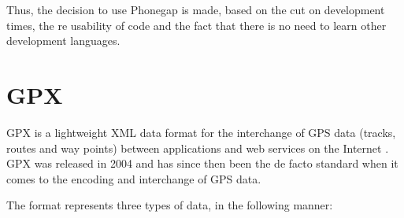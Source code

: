 Thus, the decision to use Phonegap is made, based on the cut on development times, the re usability of code and the fact that there is no need to learn other development languages.

\section{GPX}\label{sec:gpx}

GPX is a lightweight XML data format for the interchange of GPS data (tracks, routes and way points) between applications and web services on the Internet \cite{gpx}. GPX was released in 2004 and has since then been the de facto standard when it comes to the encoding and interchange of GPS data.

The format represents three types of data, in the following manner:


